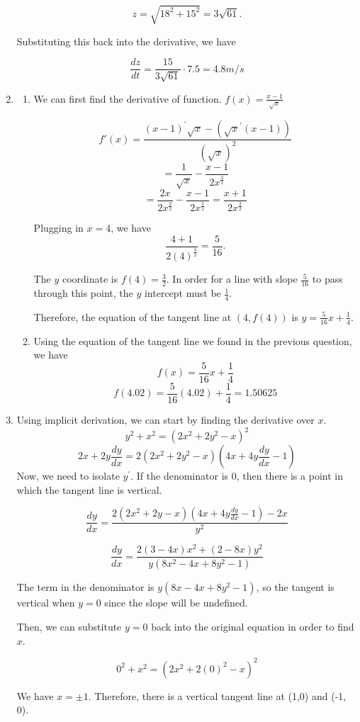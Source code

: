 \documentclass[11pt, letterpaper, twoside]{article}
\begin{document}
\begin{enumerate}
\[z=\sqrt{18^2+15^2}=3\sqrt{61}.\]

Substituting this back into the derivative, we have

\[\frac{dz}{dt}=\frac{15}{3\sqrt{61}}\cdot7.5=\boxed{4.8m/s}\]

\item \begin{enumerate}[label=(\alph*)]
\item We can first find the derivative of function. \(f(x)=\frac{x-1}{\sqrt{x}}\)

\[f'(x)=\frac{(x-1)^\prime\sqrt{x}-(\sqrt{x}^\prime(x-1))}{(\sqrt{x})^2}\]
\[=\frac{1}{\sqrt{x}}-\frac{x-1}{2x^{\frac{3}{2}}}\]
\[=\frac{2x}{2x^{\frac{3}{2}}}-\frac{x-1}{2x^{\frac{3}{2}}}=\frac{x+1}{2x^{\frac{3}{2}}}\]

Plugging in $x=4$, we have
\[\frac{4+1}{2(4)^{\frac{3}{2}}}=\frac{5}{16}.\]

The \(y\) coordinate is \(f(4)=\frac{3}{2}\). In order for a line with slope \(\frac{5}{16}\) to pass through this point, the \(y\) intercept must be \(\frac{1}{4}\).

Therefore, the equation of the tangent line at \((4, f(4))\) is \(\boxed{y=\frac{5}{16}x+\frac{1}{4}}\).

\item Using the equation of the tangent line we found in the previous question, we have \[f(x)=\frac{5}{16}x+\frac{1}{4}\]
\[f(4.02)=\frac{5}{16}(4.02)+\frac{1}{4}=\boxed{1.50625}\]
\end{enumerate}
\item Using implicit derivation, we can start by finding the derivative over \(x\). 
\[y^2+x^2=(2x^2+2y^2-x)^2\]
\[2x+2y\frac{dy}{dx}=2(2x^2+2y^2-x)(4x+4y\frac{dy}{dx}-1)\]
Now, we need to isolate \(y^\prime\). If the denominator is 0, then there is a point in which the tangent line is vertical.

\[\frac{dy}{dx}=\frac{2(2x^2+2y-x)(4x+4y\frac{dy}{dx}-1)-2x}{y^2}\]

\[ \frac{dy}{dx}= \frac{2 (3 - 4 x) x^2 + (2 - 8 x) y^2}{y (8 x^2 - 4 x + 8 y^2 - 1)}\]

The term in the denominator is \(y(8x-4x+8y^2-1)\), so the tangent is vertical when \(y=0\) since the slope will be undefined.

Then, we can substitute \(y=0\) back into the original equation in order to find \(x.\)

\[0^2+x^2=(2x^2+2(0)^2-x)^2\]

We have \(x=\pm1\). Therefore, there is a vertical tangent line at (1,0) and (-1, 0).


\end{enumerate}
\end{document}
